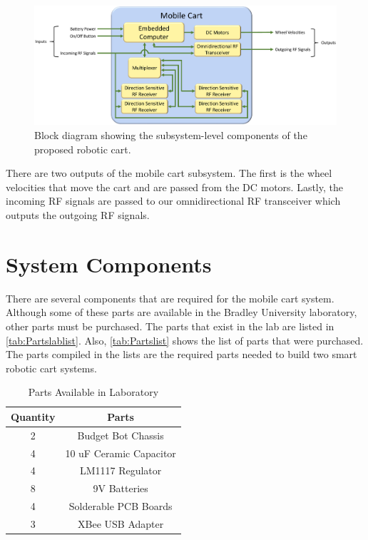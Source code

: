 \begin{figure}[H]
  \centering
  \includegraphics[width=\textwidth]{figs/mobileCartBlockDiagram.pdf}
  \caption{Block diagram showing the subsystem-level components of the proposed robotic cart.}
  \label{fig:mobile_block_diag}
\end{figure}

\vspace*{12pt}
\noindent
There are two outputs of the mobile cart subsystem. The first is the wheel velocities that move the cart and are passed from the DC motors. Lastly, the incoming RF signals are passed to our omnidirectional RF transceiver which outputs the outgoing RF signals.


\section{System Components}
\label{sec:System Components}

There are several components that are required for the mobile cart system.
Although some of these parts are available in the Bradley University laboratory,
other parts must be purchased. The parts that exist in the lab are listed in
\autoref{tab:Partslablist}. Also, \autoref{tab:Partslist} shows the list of
parts that were purchased. The parts compiled in the lists are the required
parts needed to build two smart robotic cart systems.

\begin{table}[H]
  \centering
  \caption{Parts Available in Laboratory}
  \begin{tabular}{c|c}
      \toprule
      \textbf{Quantity} & \textbf{Parts}\\
      \toprule
      2 & Budget Bot Chassis\\
      4 & 10 uF Ceramic Capacitor\\
      4 & LM1117 Regulator\\
      8 & 9V Batteries\\
      4 & Solderable PCB Boards\\
      3 & XBee USB Adapter\\
      \bottomrule
  \end{tabular}
  \label{tab:Partslablist}
\end{table}

